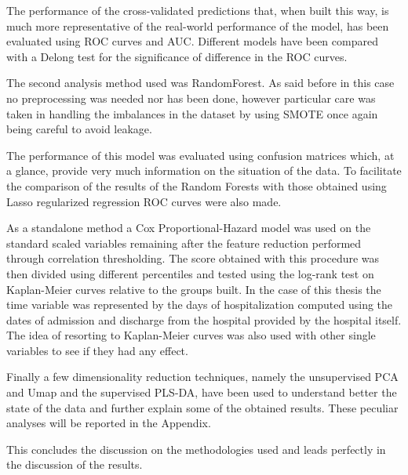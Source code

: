The performance of the cross-validated predictions that, when built this way, is much more representative of the real-world performance of the model, has been evaluated using ROC curves and AUC.
Different models have been compared with a Delong test\cite{Delong} for the significance of difference in the ROC curves.

The second analysis method used was RandomForest. As said before in this case no preprocessing was needed nor has been done, however particular care was taken in handling the imbalances in the dataset by using SMOTE \cite{SMOTE} once again being careful to avoid leakage. 

The performance of this model was evaluated using confusion matrices which, at a glance, provide very much information on the situation of the data.
To facilitate the comparison of the results of the Random Forests with those obtained using Lasso regularized regression ROC curves were also made.

As a standalone method a Cox Proportional-Hazard model was used on the standard scaled variables remaining after the feature reduction performed through correlation thresholding. 
The score obtained with this procedure was then divided using different percentiles and tested using the log-rank test on Kaplan-Meier curves relative to the groups built.
In the case of this thesis the time variable was represented by the days of hospitalization computed using the dates of admission and discharge from the hospital provided by the hospital itself.
The idea of resorting to Kaplan-Meier curves was also used with other single variables to see if they had any effect. 

Finally a few dimensionality reduction techniques, namely the unsupervised PCA\cite{PCA} and Umap \cite{UMAP} and the supervised PLS-DA\cite{PLSDA}, have been used to understand better the state of the data and further explain some of the obtained results.
These peculiar analyses will be reported in the Appendix.

This concludes the discussion on the methodologies used and leads perfectly in the discussion of the results.









